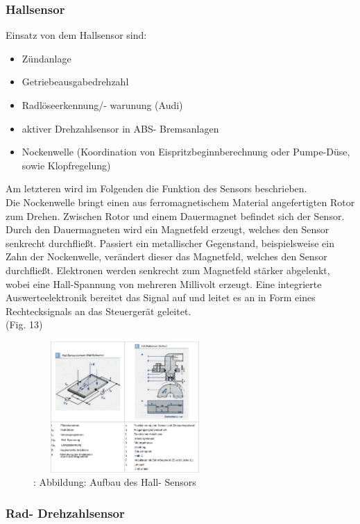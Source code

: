			\subsubsection{Hallsensor}
				Einsatz von dem Hallsensor sind: 
				\begin{itemize}
					\item Zündanlage
					\item Getriebeausgabedrehzahl
					\item Radlöseerkennung/- warunung (Audi)
					\item aktiver Drehzahlsensor in ABS- Bremsanlagen
					\item Nockenwelle (Koordination von Eispritzbeginnberechnung oder Pumpe-Düse, sowie Klopfregelung)
				\end{itemize}
				
				Am letzteren wird im Folgenden die Funktion des Sensors beschrieben.\\
				Die Nockenwelle bringt einen aus ferromagnetischem Material angefertigten Rotor zum Drehen. Zwischen Rotor und einem Dauermagnet befindet sich der Sensor. Durch den Dauermagneten wird ein Magnetfeld erzeugt, welches den Sensor senkrecht durchfließt. Passiert ein metallischer Gegenstand, beispielsweise ein Zahn der Nockenwelle, verändert dieser das Magnetfeld, welches den Sensor durchfließt.
				Elektronen werden senkrecht zum Magnetfeld stärker abgelenkt, wobei eine Hall-Spannung von mehreren Millivolt erzeugt. Eine integrierte Auswerteelektronik bereitet das Signal auf und leitet es an in Form eines Rechtecksignals an das Steuergerät geleitet.\\\cite{TS_hall}
				(Fig. 13)
				\begin{figure}
					\centering
					\includegraphics[width=7cm, height=5cm] {hall.png}
					\caption {\cite{TS_hall_pic}: Abbildung: Aufbau des Hall- Sensors}
				\end{figure}
			
			
			\subsubsection{Rad- Drehzahlsensor}
			
